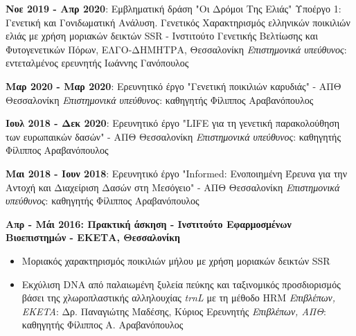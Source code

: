 \documentclass[12pt,]{scrartcl}
\begin{document}
\textbf{Νοε 2019 - Απρ 2020}: Εμβληματική δράση "Οι Δρόμοι Της Ελιάς" Υποέργο 1: Γενετική και Γονιδωματική Ανάλυση. Γενετικός Χαρακτηρισμός ελληνικών ποικιλιών ελιάς με χρήση μοριακών δεικτών SSR - Ινστιτούτο Γενετικής Βελτίωσης και Φυτογενετικών Πόρων, ΕΛΓΟ-ΔΗΜΗΤΡΑ, Θεσσαλονίκη
\vspace{2mm}
\newline
\textit{Επιστημονικά υπεύθυνος}: εντεταλμένος ερευνητής Ιωάννης Γανόπουλος

\textbf{Μαρ 2020 - Μαρ 2020}: Ερευνητικό έργο "Γενετική ποικιλιών καρυδιάς" - ΑΠΘ Θεσσαλονίκη
\vspace{2mm}
\newline
\textit{Επιστημονικά υπεύθυνος}: καθηγητής Φίλιππος Αραβανόπουλος

\textbf{Ιουλ 2018 - Δεκ 2020}: Ερευνητικό έργο "LIFE για τη γενετική παρακολούθηση των ευρωπαικών δασών" - ΑΠΘ Θεσσαλονίκη
\vspace{2mm}
\newline
\textit{Επιστημονικά υπεύθυνος}: καθηγητής Φίλιππος Αραβανόπουλος

\textbf{Μαι 2018 - Ιουν 2018}: Ερευνητικό έργο "Informed: Ενοποιημένη Έρευνα για την Αντοχή και Διαχείριση Δασών στη Μεσόγειο" - ΑΠΘ Θεσσαλονίκη
\vspace{2mm}
\newline
\textit{Επιστημονικά υπεύθυνος}: καθηγητής Φίλιππος Αραβανόπουλος

\vspace{3mm}
\textbf{Απρ - Μάι 2016: Πρακτική άσκηση - Ινστιτούτο Εφαρμοσμένων Βιοεπιστημών - ΕΚΕΤΑ, Θεσσαλονίκη}


\vspace{3mm}
\begin{itemize}
\vspace{-3mm}
\setlength\itemsep{-0.6em}
\item Μοριακός χαρακτηρισμός ποικιλιών μήλου με χρήση μοριακών δεικτών SSR 
\item Εκχύλιση DNA από παλαιωμένη ξυλεία πεύκης και ταξινομικός προσδιορισμός βάσει της χλωροπλαστικής αλληλουχίας \textit{trnL} με τη μέθοδο HRM
\vspace{2mm}
\newline
\textit{Επιβλέπων, EKETA}: Δρ. Παναγιώτης Μαδέσης, Κύριος Ερευνητής
\newline
\textit{Επιβλέπων, ΑΠΘ}: καθηγητής Φίλιππος Α. Αραβανόπουλος
\end{itemize}
\end{document}
